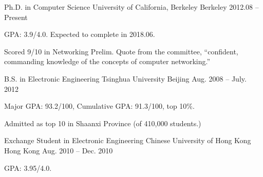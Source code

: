 

\begin{cventries}

  \cventry
  {Ph.D. in Computer Science}
  {University of California, Berkeley}
  {Berkeley}
  {2012.08 -- Present}
  {
    \begin{cvitems}
    \item GPA: 3.9/4.0. Expected to complete in 2018.06.
    \item Scored 9/10 in Networking Prelim. Quote from the committee,
      ``confident, commanding knowledge of the concepts of computer
      networking.''
    \end{cvitems}
  }

  \cventry
  {B.S. in Electronic Engineering}
  {Tsinghua University}
  {Beijing}
  {Aug. 2008 -- July. 2012}
  {
    \begin{cvitems}
    \item{Major GPA: 93.2/100, Cumulative GPA: 91.3/100, top 10\%.}
    \item{Admitted as top 10 in Shaanxi Province (of 410,000 students.)}
    \end{cvitems}
  }

  \cventry
  {Exchange Student in Electronic Engineering}
  {Chinese University of Hong Kong}
  {Hong Kong}
  {Aug. 2010 -- Dec. 2010}
  {
    \begin{cvitems}
    \item {GPA: 3.95/4.0.}
    \end{cvitems}
  }

\end{cventries}

